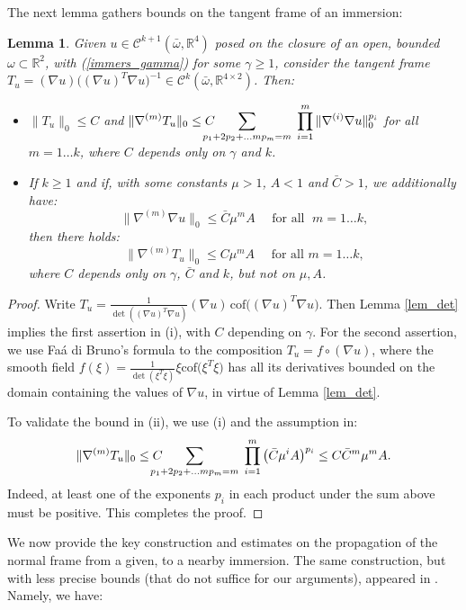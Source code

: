 \documentclass[reqno,twoside,11pt]{amsart}
\newcommand{\R}{\mathbb{R}}
\numberwithin{equation}{section}
\theoremstyle{plain}
\newtheorem{lemma}[theorem]{Lemma}
\theoremstyle{definition}
\begin{document}
The next lemma gathers bounds on the tangent frame of an immersion:

\begin{lemma}\label{lem_Tu}
Given $u\in\mathcal{C}^{k+1}(\bar\omega,\R^4)$ posed on the closure of an
open, bounded $\omega\subset\R^2$, with  (\ref{immers_gamma}) for
some $\gamma\geq 1$, consider the tangent frame $T_u=(\nabla u)\big((\nabla u)^T\nabla
u\big)^{-1}\in\mathcal{C}^{k}(\bar\omega,\R^{4\times 2})$. Then:
\begin{itemize}
\item[(i)] $\|T_u\|_0\leq C$ and $\displaystyle{\|\nabla^{(m)}T_u\|_0\leq C
\hspace{-4mm} \sum_{p_1+2p_2+\ldots mp_m=m} \; \prod_{i=1}^m\|\nabla^{(i)}\nabla u\|_0^{p_i}}$
for all $ m=1\ldots k$, where $C$ depends only on $\gamma$ and $k$.
\item[(ii)] If $k\geq 1$ and if, with some constants $\mu>1$, $A<1$ and
  $\bar C>1$, we additionally have:
$$\|\nabla^{(m)}\nabla u\|_0\leq \bar C \mu^{m}A \quad \mbox{ for all } \; m=1\ldots k,$$
then there holds:
$$\|\nabla^{(m)}T_u\|_0\leq C\mu^m A \quad\mbox{ for all } m=1\ldots k,$$
where $C$ depends only on $\gamma$, $\bar C$ and $k$, but not on $\mu, A$.
\end{itemize}  
\end{lemma}
\begin{proof}
Write $T_u=\frac{1}{\det((\nabla u)^T\nabla u)}(\nabla
u)\,\mbox{cof}\big((\nabla u)^T\nabla u\big)$. Then Lemma
\ref{lem_det} implies the first assertion in (i), with $C$ depending on
$\gamma$. For the second assertion, we use Fa\'a di Bruno's formula
to the composition $T_u=f\circ (\nabla u)$, where the smooth field
$f(\xi) = \frac{1}{\det(\xi^T\xi)}\xi \mbox{cof}\big(\xi^T\xi\big)$
has all its derivatives bounded on the
domain containing the values of $\nabla u$, in virtue of Lemma \ref{lem_det}.

\medskip

\noindent To validate the bound in (ii), we use (i) and the assumption in:
$$\|\nabla^{(m)}T_u\|_0\leq C
\hspace{-4mm} \sum_{p_1+2p_2+\ldots mp_m=m} \; \prod_{i=1}^m\big(\bar
C \mu^i A\big)^{p_i} \leq C {\bar C}^m\mu^m A.$$
Indeed, at least one of the exponents $p_i$ in each product under the sum
above must be positive. This completes the proof.
\end{proof}

\medskip

We now provide the key construction and estimates
on the propagation of the normal frame from a given, to a nearby
immersion. The same construction, but with less precise bounds (that do not suffice for our arguments), 
appeared in \cite[Proposition 5.3]{DI2020}. Namely, we have:
\end{document}
